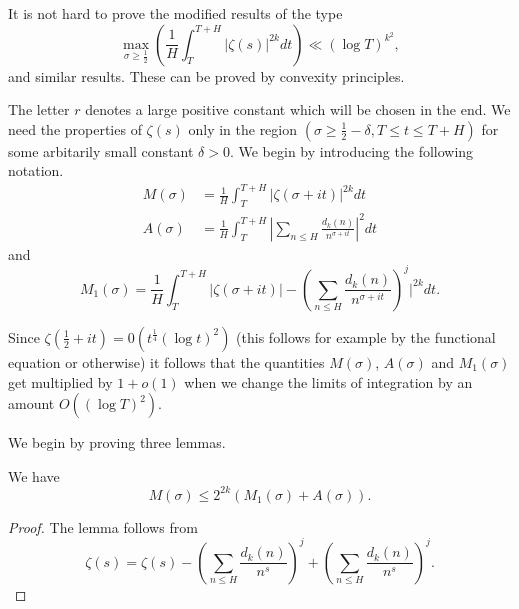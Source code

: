 \begin{remark*}
It is not hard to prove the modified results of the type
\begin{equation*}
\max\limits_{\sigma \geq \frac{1}{2}} \left(\frac{1}{H} \int^{T+H}_T |\zeta(s)|^{2k} dt \right) \ll (\log T)^{k^2},  \tag{4.3.4}\label{c4:eq4.3.4}
\end{equation*}
and similar results. These can be proved by convexity principles.
\end{remark*}

The letter $r$ denotes a large positive constant which will be chosen in the end. We need the properties of $\zeta(s)$ only in the region $(\sigma \geq \frac{1}{2} - \delta, T \leq t \leq  T+ H)$ for some arbitarily small constant $\delta > 0$. We begin by introducing the following notation.
\begin{align*}
M(\sigma) & = \frac{1}{H} \int^{T+H}_T |\zeta( \sigma + it)|^{2k}  dt \tag{4.3.5}\label{c4:eq4.3.5}\\
A (\sigma) & = \frac{1}{H} \int^{T+H}_T |\sum\limits_{n\leq H} \frac{d_k(n)}{n^{\sigma + it}}|^2 dt \tag{4.3.6} \label{c4:eq4.3.6}
\end{align*}\pageoriginale
and 
\begin{equation*}
M_1 (\sigma) = \frac{1}{H} \int^{T+H}_T |\zeta(\sigma + it)| - \left(\sum\limits_{n\leq H} \frac{d_k(n)}{n^{\sigma+it}}\right)^j |^{2k} dt.  \tag{4.3.7}\label{c4:eq4.3.7}
\end{equation*}

\begin{remark*}
Since $\zeta(\frac{1}{2} + it) = 0 (t^{\frac{1}{4}} (\log t)^2)$ (this follows for example by the functional equation or otherwise) it follows that the quantities $M(\sigma)$, $A(\sigma)$ and $M_1(\sigma)$ get multiplied by $1+ o(1)$ when we change the limits of integration by an amount $O((\log T)^2)$.

We begin by proving three lemmas.
\end{remark*}

\setcounter{lem}{0}
\begin{lem}\label{c4:lem1a}
We have
$$
M(\sigma) \leq 2^{2k} (M_1(\sigma) + A(\sigma)).
$$
\end{lem}

\begin{proof}
The lemma follows from
$$
\zeta(s) = \zeta(s) - \left(\sum\limits_{n \leq H} \frac{d_k (n)}{n^s} \right)^j + \left(\sum\limits_{n\leq H} \frac{d_k (n)}{n^s}\right)^j.
$$
\end{proof}

